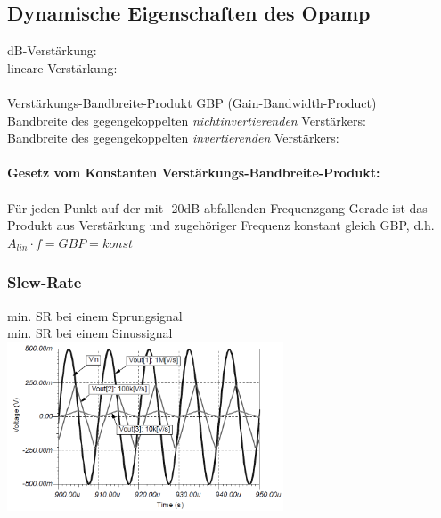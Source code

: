 		\subsection{Dynamische Eigenschaften des Opamp }
			\begin{minipage}{18cm}
            	dB-Verstärkung: \hspace{4.5mm}
            	\\
            	lineare Verstärkung:
            	\\ \\
            	Verstärkungs-Bandbreite-Produkt GBP (Gain-Bandwidth-Product)\\
            	Bandbreite des gegengekoppelten {\it nichtinvertierenden} Verstärkers:
            	\\
            	Bandbreite des gegengekoppelten {\it invertierenden} Verstärkers: \hspace{6.5mm}
            	\\ \\
            	{\bf Gesetz vom Konstanten Verstärkungs-Bandbreite-Produkt:} \\ \\
            	Für jeden Punkt auf der mit -20dB abfallenden Frequenzgang-Gerade ist das
            	Produkt aus Verstärkung und zugehöriger Frequenz konstant gleich GBP, d.h. $A_{lin}\cdot f=GBP=konst$\\
            \end{minipage}
		\subsubsection{Slew-Rate}
		min. SR bei einem Sprungsignal \hspace{4mm}
		\\ 
		min. SR bei einem Sinussignal \hspace{4.5mm} 
		\\
		\includegraphics[height=5cm]{./bilder/slew-rate.png}\\